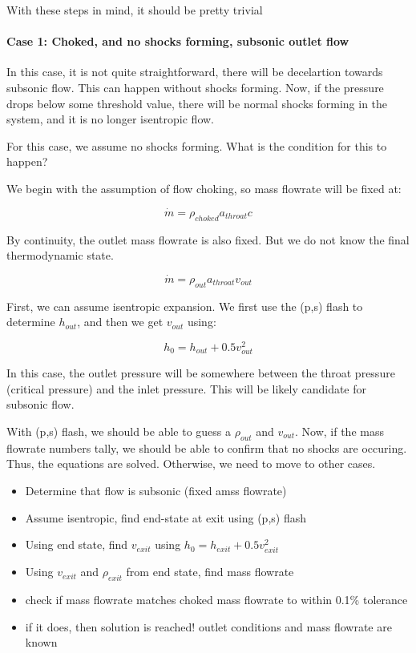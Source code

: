 \documentclass[masters]{ucbthesis}
\renewcommand{\_}{\kern-1.5pt\textunderscore\kern-1.5pt}
\begin{document}
With these steps in mind, it should be pretty trivial

\paragraph{Case 1: Choked, and no shocks forming, subsonic outlet flow}

In this case, it is not quite straightforward, there will be 
decelartion towards subsonic flow. This can happen without shocks forming.
Now, if the pressure drops below some threshold value, there will be 
normal shocks forming in the system, and it is no longer isentropic flow.

For this case, we assume no shocks forming. What is the condition for this 
to happen?

We begin with the assumption of flow choking, so mass flowrate will be 
fixed at:

\begin{equation*}
	\dot{m} = \rho_{choked} a_{throat} c
\end{equation*}

By continuity, the outlet mass flowrate is also fixed. But we do not know 
the final thermodynamic state.

\begin{equation*}
	\dot{m} = \rho_{out} a_{throat} v_{out}
\end{equation*}

First, we can assume isentropic expansion. We first use the (p,s) flash 
to determine $h_{out}$, and then we get $v_{out}$ using:

\begin{equation*}
	h_0 = h_{out} + 0.5 v^2_{out}
\end{equation*}

In this case, the outlet pressure will be somewhere between the throat 
pressure (critical pressure) and the inlet pressure. This will be likely 
candidate for subsonic flow.

With (p,s) flash, we should be able to guess a $\rho_{out}$ and $v_{out}$.
Now, if the mass flowrate numbers tally, we should be able to confirm that no shocks 
are occuring. Thus, the equations are solved. Otherwise, we need to move 
to other cases.

\begin{itemize}
	\item Determine that flow is subsonic (fixed amss flowrate)
	\item Assume isentropic, find end-state at exit using (p,s) flash 
	\item Using end state, find $v_{exit}$ using $h_0 = h_{exit} + 0.5 v_{exit}^2$
	\item Using $v_{exit}$ and $\rho_{exit}$ from end state, find mass flowrate
	\item check if mass flowrate matches choked mass flowrate to within 0.1\% tolerance
	\item if it does, then solution is reached! outlet conditions and mass flowrate are known
\end{itemize}
\end{document}
